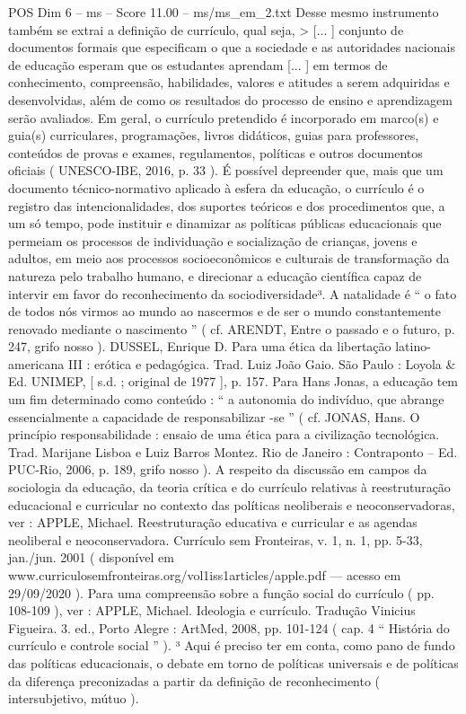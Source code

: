 \begin{textsample}{POS Dim 6 – ms – Score 11.00 – ms/ms\_em\_2.txt}
Desse mesmo instrumento também se extrai a definição de currículo, qual seja, > [... ] conjunto de documentos formais que especificam o que a sociedade e as autoridades nacionais de educação esperam que os estudantes aprendam [... ] em termos de conhecimento, compreensão, habilidades, valores e atitudes a serem adquiridas e desenvolvidas, além de como os resultados do processo de ensino e aprendizagem serão avaliados.
Em geral, o currículo pretendido é incorporado em marco(s) e guia(s) curriculares, programações, livros didáticos, guias para professores, conteúdos de provas e exames, regulamentos, políticas e outros documentos oficiais ( UNESCO-IBE, 2016, p. 33 ).
É possível depreender que, mais que um documento técnico-normativo aplicado à esfera da educação, o currículo é o registro das intencionalidades, dos suportes teóricos e dos procedimentos que, a um só tempo, pode instituir e dinamizar as políticas públicas educacionais que permeiam os processos de individuação e socialização de crianças, jovens e adultos, em meio aos processos socioeconômicos e culturais de transformação da natureza pelo trabalho humano, e direcionar a educação científica capaz de intervir em favor do reconhecimento da sociodiversidade³.
A natalidade é “ o fato de todos nós virmos ao mundo ao nascermos e de ser o mundo constantemente renovado mediante o nascimento ” ( cf.
ARENDT, Entre o passado e o futuro, p. 247, grifo nosso ).
DUSSEL, Enrique D.
Para uma ética da libertação latino-americana III : erótica e pedagógica.
Trad.
Luiz João Gaio.
São Paulo : Loyola \& Ed.
UNIMEP, [ s.d. ; original de 1977 ], p. 157.
Para Hans Jonas, a educação tem um fim determinado como conteúdo : “ a autonomia do indivíduo, que abrange essencialmente a capacidade de responsabilizar -se ” ( cf.
JONAS, Hans.
O princípio responsabilidade : ensaio de uma ética para a civilização tecnológica.
Trad.
Marijane Lisboa e Luiz Barros Montez.
Rio de Janeiro : Contraponto – Ed.
PUC-Rio, 2006, p. 189, grifo nosso ).
A respeito da discussão em campos da sociologia da educação, da teoria crítica e do currículo relativas à reestruturação educacional e curricular no contexto das políticas neoliberais e neoconservadoras, ver : APPLE, Michael.
Reestruturação educativa e curricular e as agendas neoliberal e neoconservadora.
Currículo sem Fronteiras, v. 1, n. 1, pp. 5-33, jan./jun. 2001 ( disponível em www.curriculosemfronteiras.org/vol1iss1articles/apple.pdf — acesso em 29/09/2020 ).
Para uma compreensão sobre a função social do currículo ( pp. 108-109 ), ver : APPLE, Michael.
Ideologia e currículo.
Tradução Vinicius Figueira. 3. ed., Porto Alegre : ArtMed, 2008, pp. 101-124 ( cap. 4 “ História do currículo e controle social ” ). ³ Aqui é preciso ter em conta, como pano de fundo das políticas educacionais, o debate em torno de políticas universais e de políticas da diferença preconizadas a partir da definição de reconhecimento ( intersubjetivo, mútuo ).

\end{textsample}
